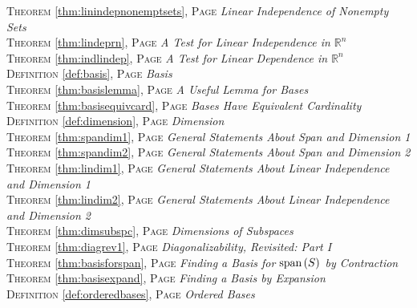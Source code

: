 \begin{multicols}{2}
{\textsc{Theorem} \ref{thm:linindepnonemptsets}, \textsc{Page} \pageref{thm:linindepnonemptsets} \textit{Linear Independence of Nonempty Sets} \\
\textsc{Theorem} \ref{thm:lindeprn}, \textsc{Page} \pageref{thm:lindeprn} \textit{A Test for Linear Independence in \(\mathbb {R}^n\)} \\
\textsc{Theorem} \ref{thm:indlindep}, \textsc{Page} \pageref{thm:indlindep} \textit{A Test for Linear Dependence in \(\mathbb {R}^n\)} \\
\textsc{Definition} \ref{def:basis}, \textsc{Page} \pageref{def:basis} \textit{Basis} \\
\textsc{Theorem} \ref{thm:basislemma}, \textsc{Page} \pageref{thm:basislemma} \textit{A Useful Lemma for Bases} \\
\textsc{Theorem} \ref{thm:basisequivcard}, \textsc{Page} \pageref{thm:basisequivcard} \textit{Bases Have Equivalent Cardinality} \\
\textsc{Definition} \ref{def:dimension}, \textsc{Page} \pageref{def:dimension} \textit{Dimension} \\
\textsc{Theorem} \ref{thm:spandim1}, \textsc{Page} \pageref{thm:spandim1} \textit{General Statements About Span and Dimension 1} \\
\textsc{Theorem} \ref{thm:spandim2}, \textsc{Page} \pageref{thm:spandim2} \textit{General Statements About Span and Dimension 2} \\
\textsc{Theorem} \ref{thm:lindim1}, \textsc{Page} \pageref{thm:lindim1} \textit{General Statements About Linear Independence and Dimension 1} \\
\textsc{Theorem} \ref{thm:lindim2}, \textsc{Page} \pageref{thm:lindim2} \textit{General Statements About Linear Independence and Dimension 2} \\
\textsc{Theorem} \ref{thm:dimsubspc}, \textsc{Page} \pageref{thm:dimsubspc} \textit{Dimensions of Subspaces} \\
\textsc{Theorem} \ref{thm:diagrev1}, \textsc{Page} \pageref{thm:diagrev1} \textit{Diagonalizability, Revisited: Part I} \\
\textsc{Theorem} \ref{thm:basisforspan}, \textsc{Page} \pageref{thm:basisforspan} \textit{Finding a Basis for \(\text{span\,} (S)\) by Contraction} \\
\textsc{Theorem} \ref{thm:basisexpand}, \textsc{Page} \pageref{thm:basisexpand} \textit{Finding a Basis by Expansion} \\
\textsc{Definition} \ref{def:orderedbases}, \textsc{Page} \pageref{def:orderedbases} \textit{Ordered Bases} \\
}
\end{multicols}
